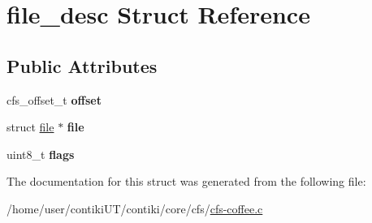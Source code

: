\hypertarget{structfile__desc}{}\section{file\+\_\+desc Struct Reference}
\label{structfile__desc}
\subsection*{Public Attributes}
\begin{DoxyCompactItemize}
\item 
\hypertarget{structfile__desc_afacce8ad9a9c418bffbf193c180eff8d}{}cfs\+\_\+offset\+\_\+t {\bfseries offset}\label{structfile__desc_afacce8ad9a9c418bffbf193c180eff8d}

\item 
\hypertarget{structfile__desc_a64f10e47f73b034cba90d0fb5840a8ab}{}struct \hyperlink{structfile}{file} $\ast$ {\bfseries file}\label{structfile__desc_a64f10e47f73b034cba90d0fb5840a8ab}

\item 
\hypertarget{structfile__desc_a9df8f9b3b2ab6daa219e924f16b9f96f}{}uint8\+\_\+t {\bfseries flags}\label{structfile__desc_a9df8f9b3b2ab6daa219e924f16b9f96f}

\end{DoxyCompactItemize}


The documentation for this struct was generated from the following file\+:\begin{DoxyCompactItemize}
\item 
/home/user/contiki\+U\+T/contiki/core/cfs/\hyperlink{cfs-coffee_8c}{cfs-\/coffee.\+c}\end{DoxyCompactItemize}
